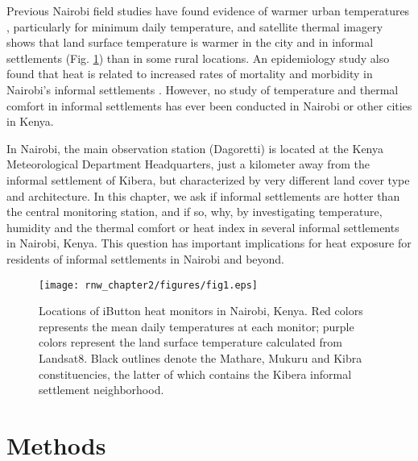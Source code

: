 Previous Nairobi field studies have found evidence of warmer urban temperatures \citep{okoola1979nairobi}, particularly for minimum daily temperature, and satellite thermal imagery shows that land surface temperature is warmer in the city and in informal settlements (Fig. \ref{map}) than in some rural locations.
An epidemiology study also found that heat
is related to increased rates of mortality and morbidity in Nairobi's informal settlements \citep{egondi2012}. However, no study of temperature and thermal comfort in informal settlements has ever been conducted in Nairobi or other cities in Kenya.  

In Nairobi, the main observation station (Dagoretti) is located at the Kenya Meteorological Department Headquarters, just a kilometer away from the informal settlement of Kibera, but characterized by very different land cover type and architecture.
In this chapter, we ask if informal settlements are hotter than the central monitoring station, and if so, why, by investigating temperature, humidity and the thermal comfort or heat index in several informal settlements in Nairobi, Kenya. This question has important implications for heat exposure for residents of informal settlements in Nairobi and beyond. 

\begin{figure}%
\texttt{[image: rnw\_chapter2/figures/fig1.eps]}
\caption{Locations of iButton heat monitors in Nairobi, Kenya. Red colors represents the mean daily temperatures at each monitor; purple colors represent the land surface temperature calculated from Landsat8. Black outlines denote the Mathare, Mukuru and Kibra constituencies, the latter of which contains the Kibera informal settlement neighborhood.}
\label{map}
\end{figure}

\section{Methods}
